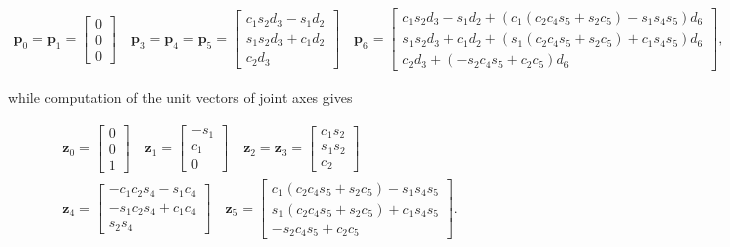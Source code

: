 \documentclass[10pt]{article}
\begin{document}
$$
\begin{gathered}
\boldsymbol{p}_{0}=\boldsymbol{p}_{1}=\left[\begin{array}{l}
0 \\
0 \\
0
\end{array}\right] \quad \boldsymbol{p}_{3}=\boldsymbol{p}_{4}=\boldsymbol{p}_{5}=\left[\begin{array}{c}
c_{1} s_{2} d_{3}-s_{1} d_{2} \\
s_{1} s_{2} d_{3}+c_{1} d_{2} \\
c_{2} d_{3}
\end{array}\right] \quad
\boldsymbol{p}_{6}=\left[\begin{array}{c}
c_{1} s_{2} d_{3}-s_{1} d_{2}+\left(c_{1}\left(c_{2} c_{4} s_{5}+s_{2} c_{5}\right)-s_{1} s_{4} s_{5}\right) d_{6} \\
s_{1} s_{2} d_{3}+c_{1} d_{2}+\left(s_{1}\left(c_{2} c_{4} s_{5}+s_{2} c_{5}\right)+c_{1} s_{4} s_{5}\right) d_{6} \\
c_{2} d_{3}+\left(-s_{2} c_{4} s_{5}+c_{2} c_{5}\right) d_{6}
\end{array}\right],
\end{gathered}
$$

while computation of the unit vectors of joint axes gives

$$
\begin{gathered}
\boldsymbol{z}_{0}=\left[\begin{array}{l}
0 \\
0 \\
1
\end{array}\right] \quad \boldsymbol{z}_{1}=\left[\begin{array}{c}
-s_{1} \\
c_{1} \\
0
\end{array}\right] \quad \boldsymbol{z}_{2}=\boldsymbol{z}_{3}=\left[\begin{array}{c}
c_{1} s_{2} \\
s_{1} s_{2} \\
c_{2}
\end{array}\right] \\
\boldsymbol{z}_{4}=\left[\begin{array}{c}
-c_{1} c_{2} s_{4}-s_{1} c_{4} \\
-s_{1} c_{2} s_{4}+c_{1} c_{4} \\
s_{2} s_{4}
\end{array}\right] \quad \boldsymbol{z}_{5}=\left[\begin{array}{c}
c_{1}\left(c_{2} c_{4} s_{5}+s_{2} c_{5}\right)-s_{1} s_{4} s_{5} \\
s_{1}\left(c_{2} c_{4} s_{5}+s_{2} c_{5}\right)+c_{1} s_{4} s_{5} \\
-s_{2} c_{4} s_{5}+c_{2} c_{5}
\end{array}\right] .
\end{gathered}
$$
\end{document}
